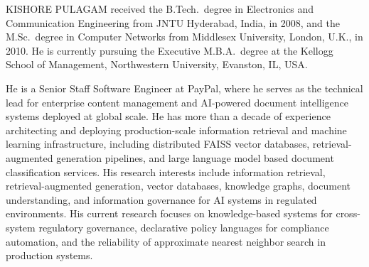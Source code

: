 \documentclass{ieeeaccess}
\begin{document}
\begin{IEEEbiographynophoto}{KISHORE PULAGAM}
received the B.Tech.\ degree in Electronics and Communication Engineering from JNTU Hyderabad, India, in 2008, and the M.Sc.\ degree in Computer Networks from Middlesex University, London, U.K., in 2010. He is currently pursuing the Executive M.B.A.\ degree at the Kellogg School of Management, Northwestern University, Evanston, IL, USA.

He is a Senior Staff Software Engineer at PayPal, where he serves as the technical lead for enterprise content management and AI-powered document intelligence systems deployed at global scale. He has more than a decade of experience architecting and deploying production-scale information retrieval and machine learning infrastructure, including distributed FAISS vector databases, retrieval-augmented generation pipelines, and large language model based document classification services. His research interests include information retrieval, retrieval-augmented generation, vector databases, knowledge graphs, document understanding, and information governance for AI systems in regulated environments. His current research focuses on knowledge-based systems for cross-system regulatory governance, declarative policy languages for compliance automation, and the reliability of approximate nearest neighbor search in production systems.
\end{IEEEbiographynophoto}

\EOD
\end{document}
